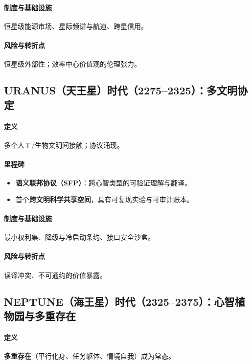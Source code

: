 \documentclass[11pt]{article}
\begin{document}
\paragraph{制度与基础设施} 恒星级能源市场、星际频谱与航道、跨星信用。

\paragraph{风险与转折点} 恒星级外部性；效率中心价值观的伦理张力。

\subsection{URANUS（天王星）时代（2275–2325）：多文明协定}
\paragraph{定义} 多个人工/生物文明间接触；协议涌现。

\paragraph{里程碑}
\begin{itemize}[noitemsep]
  \item \textbf{语义联邦协议（SFP）}：跨心智类型的可验证理解与翻译。
  \item 首个\textbf{跨文明科学共享空间}，具有可复现实验与可审计账本。
\end{itemize}

\paragraph{制度与基础设施} 最小权利集、降级与冷启动条约、接口安全沙盒。

\paragraph{风险与转折点} 误译冲突、不可通约的价值暴露。

\subsection{NEPTUNE（海王星）时代（2325–2375）：心智植物园与多重存在}
\paragraph{定义} \textbf{多重存在}（平行化身、任务躯体、情境自我）成为常态。
\end{document}
